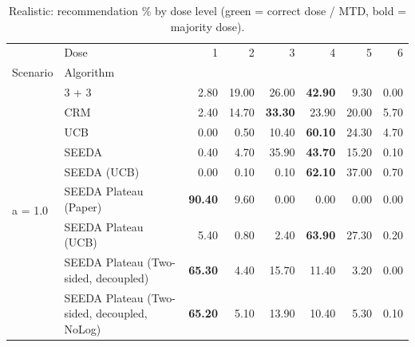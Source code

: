\begin{table}[H]
\centering
\caption{Realistic: recommendation \% by dose level (green = correct dose / MTD, bold = majority dose).}
\label{tab:real_rec_by_dose}
\begin{tabular}{llrrrrrr}
\toprule
 & Dose & 1 & 2 & 3 & 4 & 5 & 6 \\
Scenario & Algorithm &  &  &  &  &  &  \\
\midrule
\multirow[c]{9}{*}{a = 1.0} & 3 + 3 & 2.80 & 19.00 & {\cellcolor[HTML]{C8E6C9}} 26.00 & \bfseries 42.90 & 9.30 & 0.00 \\
 & CRM & 2.40 & 14.70 & {\cellcolor[HTML]{C8E6C9}} \bfseries 33.30 & 23.90 & 20.00 & 5.70 \\
 & UCB & 0.00 & 0.50 & {\cellcolor[HTML]{C8E6C9}} 10.40 & \bfseries 60.10 & 24.30 & 4.70 \\
 & SEEDA & 0.40 & 4.70 & {\cellcolor[HTML]{C8E6C9}} 35.90 & \bfseries 43.70 & 15.20 & 0.10 \\
 & SEEDA (UCB) & 0.00 & 0.10 & {\cellcolor[HTML]{C8E6C9}} 0.10 & \bfseries 62.10 & 37.00 & 0.70 \\
 & SEEDA Plateau (Paper) & \bfseries 90.40 & 9.60 & {\cellcolor[HTML]{C8E6C9}} 0.00 & 0.00 & 0.00 & 0.00 \\
 & SEEDA Plateau (UCB) & 5.40 & 0.80 & {\cellcolor[HTML]{C8E6C9}} 2.40 & \bfseries 63.90 & 27.30 & 0.20 \\
 & SEEDA Plateau (Two-sided, decoupled) & \bfseries 65.30 & 4.40 & {\cellcolor[HTML]{C8E6C9}} 15.70 & 11.40 & 3.20 & 0.00 \\
 & SEEDA Plateau (Two-sided, decoupled, NoLog) & \bfseries 65.20 & 5.10 & {\cellcolor[HTML]{C8E6C9}} 13.90 & 10.40 & 5.30 & 0.10 \\
\bottomrule
\end{tabular}
\end{table}
